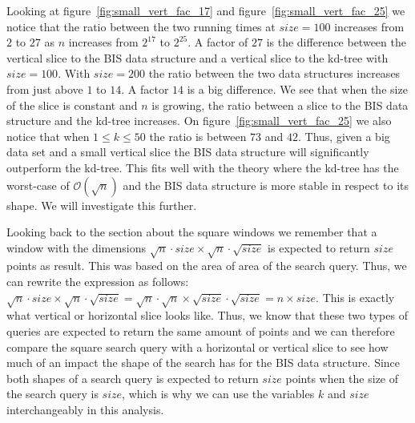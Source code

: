 Looking at figure~\ref{fig:small_vert_fac_17} and figure~\ref{fig:small_vert_fac_25} we notice that the ratio between the two running times at $size = 100$ increases from $2$ to $27$ as $n$ increases from $2^{17}$ to $2^{25}$. A factor of $27$ is the difference between the vertical slice to the BIS data structure and a vertical slice to the kd-tree with $size = 100$. With $size = 200$ the ratio between the two data structures increases from just above $1$ to $14$. A factor $14$ is a big difference. We see that when the size of the slice is constant and $n$ is growing, the ratio between a slice to the BIS data structure and the kd-tree increases. On figure~\ref{fig:small_vert_fac_25} we also notice that when $1 \leq k \leq 50$ the ratio is between $73$ and $42$. Thus, given a big data set and a small vertical slice the BIS data structure will significantly outperform the kd-tree. This fits well with the theory where the kd-tree has the worst-case of $\mathcal{O}(\sqrt{n})$ and the BIS data structure is more stable in respect to its shape. We will investigate this further.

Looking back to the section about the square windows we remember that a window with the dimensions $\sqrt{n}\cdot{size} \times \sqrt{n}\cdot\sqrt{size}$ is expected to return $size$ points as result. This was based on the area of area of the search query. Thus, we can rewrite the expression as follows: $\sqrt{n}\cdot{size} \times \sqrt{n}\cdot\sqrt{size} = \sqrt{n}\cdot\sqrt{n} \times \sqrt{size}\cdot\sqrt{size} = n \times size$. This is exactly what vertical or horizontal slice looks like. Thus, we know that these two types of queries are expected to return the same amount of points and we can therefore compare the square search query with a horizontal or vertical slice to see how much of an impact the shape of the search has for the BIS data structure. Since both shapes of a search query is expected to return $size$ points when the size of the search query is $size$, which is why we can use the variables $k$ and $size$ interchangeably in this analysis.

